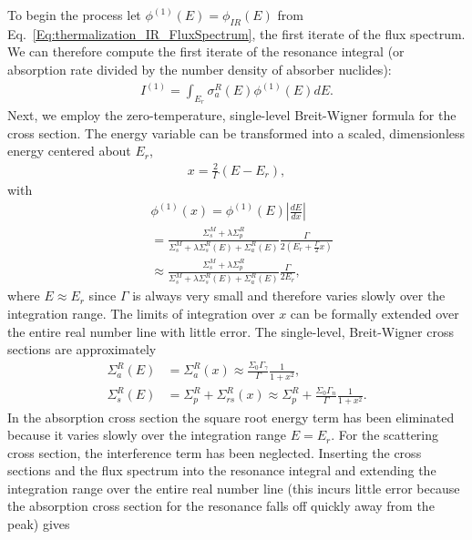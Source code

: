 To begin the process let $\phi^{(1)}(E) = \phi_{IR}(E)$ from Eq.~\eqref{Eq:thermalization_IR_FluxSpectrum}, the first iterate of the flux spectrum. We can therefore compute the first iterate of the resonance integral (or absorption rate divided by the number density of absorber nuclides):
\begin{align}
  I^{(1)} = \int_{E_r} \sigma_a^R(E) \phi^{(1)}(E) dE.
\end{align}
Next, we employ the zero-temperature, single-level Breit-Wigner formula for the cross section. The energy variable can be transformed into a scaled, dimensionless energy centered about $E_r$,
\begin{align}
  x = \frac{2}{\Gamma} ( E - E_r ), \nonumber
\end{align}
with
\begin{align}
  &\phi^{(1)}(x) = \phi^{(1)}(E) \left| \frac{dE}{dx} \right| \nonumber \\
  &= \frac{ \Sigma_s^M + \lambda \Sigma_p^R }{ \Sigma_s^M +  \lambda \Sigma_s^R(E) + \Sigma_a^R(E) } 
  \frac{\Gamma}{2\left( E_r + \frac{\Gamma}{2} x \right)} \nonumber \\
  &\approx \frac{ \Sigma_s^M + \lambda \Sigma_p^R }{ \Sigma_s^M +  \lambda \Sigma_s^R(E) + \Sigma_a^R(E) } 
  \frac{\Gamma}{2E_r},
\end{align}
where $E \approx E_r$ since $\Gamma$ is always very small and therefore varies slowly over the integration range. The limits of integration over $x$ can be formally extended over the entire real number line with little error. The single-level, Breit-Wigner cross sections are approximately
\begin{subequations}
\begin{align}
  \Sigma_a^R(E) &= \Sigma_a^R(x) \approx \frac{\Sigma_0 \Gamma_\gamma}{\Gamma} \frac{1}{1+x^2}, \\
  \Sigma_s^R(E) &= \Sigma_p^R + \Sigma_{rs}^R(x) \approx \Sigma_p^R + \frac{\Sigma_0 \Gamma_n}{\Gamma} \frac{1}{1+x^2}.
\end{align}
\end{subequations}
In the absorption cross section the square root energy term has been eliminated because it varies slowly over the integration range $E = E_r$. For the scattering cross section, the interference term has been neglected. Inserting the cross sections and the flux spectrum into the resonance integral and extending the integration range over the entire real number line (this incurs little error because the absorption cross section for the resonance falls off quickly away from the peak) gives
